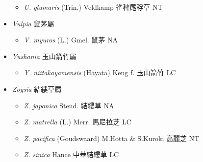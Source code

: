 \begin{itemize}
  \begin{itemize}
        \item[] \textit{U. glumaris} (Trin.) Veldkamp  雀稗尾稃草   NT
  \end{itemize}
 \item[] \textit{Vulpia} 鼠茅屬
                                
  \begin{itemize}
        \item[] \textit{V. myuros} (L.) Gmel.  鼠茅   NA
  \end{itemize}
 \item[] \textit{Yushania} 玉山箭竹屬
                                
  \begin{itemize}
        \item[] \textit{Y. niitakayamensis} (Hayata) Keng f.  玉山箭竹   LC
  \end{itemize}
 \item[] \textit{Zoysia} 結縷草屬
                                
  \begin{itemize}
        \item[] \textit{Z. japonica} Steud.  結縷草   NA
        \item[] \textit{Z. matrella} (L.) Merr.  馬尼拉芝   LC
        \item[] \textit{Z. pacifica} (Goudswaard) M.Hotta \& S.Kuroki  高麗芝   NT
        \item[] \textit{Z. sinica} Hance  中華結縷草   LC
  \end{itemize}
  \end{itemize}
